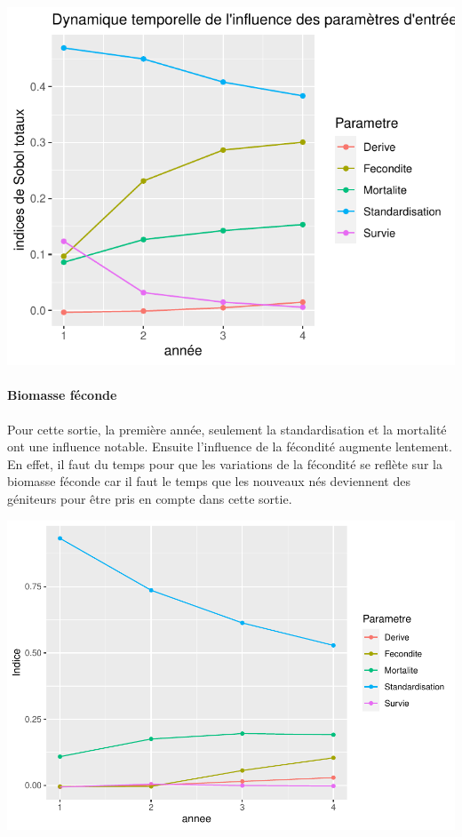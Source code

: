 \documentclass[
]{article}
\begin{document}
\includegraphics{rapport_files/figure-latex/maptao-1.pdf}

\hypertarget{biomasse-fuxe9conde-1}{%
\paragraph{Biomasse féconde}\label{biomasse-fuxe9conde-1}}

Pour cette sortie, la première année, seulement la standardisation et la
mortalité ont une influence notable. Ensuite l'influence de la fécondité
augmente lentement. En effet, il faut du temps pour que les variations
de la fécondité se reflète sur la biomasse féconde car il faut le temps
que les nouveaux nés deviennent des géniteurs pour être pris en compte
dans cette sortie.

\includegraphics{rapport_files/figure-latex/mapeao-1.pdf}
\end{document}
